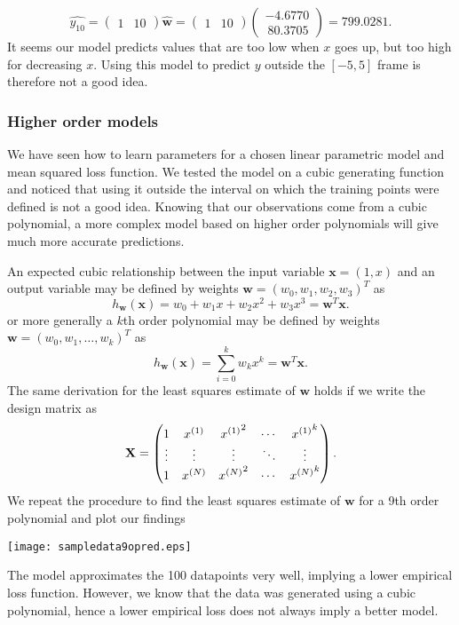 \documentclass[english]{article}
\begin{document}
\begin{equation}
\hat{y_{10}} = \begin{pmatrix}
1 & 10
\end{pmatrix} \hat{\textbf{w}} = \begin{pmatrix}
1 & 10
\end{pmatrix} \begin{pmatrix}
-4.6770 \\
\ 80.3705
\end{pmatrix} = 799.0281.
\end{equation}
It seems our model predicts values that are too low when $x$ goes up, but too high for decreasing $x$. Using this model to predict $y$ outside the $[-5,5]$ frame is therefore not a good idea.
\subsubsection{Higher order models}
We have seen how to learn parameters for a chosen linear parametric model and mean squared loss function. We tested the model on a cubic generating function and noticed that using it outside the interval on which the training points were defined is not a good idea. Knowing that our observations come from a cubic polynomial, a more complex model based on higher order polynomials will give much more accurate predictions.

An expected cubic relationship between the input variable $\textbf{x}=(1,x)$ and an output variable may be defined by weights $\textbf{w}=(w_0,w_1,w_2,w_3)^T$ as 
\begin{equation}\label{cubicrel}
h_\textbf{w}(\textbf{x})=w_0+w_1x + w_2x^2+w_3x^3 = \textbf{w}^T\textbf{x}.
\end{equation}
or more generally a $k$th order polynomial may be defined by weights $\textbf{w}=(w_0,w_1,\ldots,w_k)^T$ as 
\begin{equation}\label{kpolrel}
h_\textbf{w}(\textbf{x})= \sum_{i=0}^k w_k x^k = \textbf{w}^T\textbf{x}.
\end{equation}
The same derivation for the least squares estimate of $\textbf{w}$ holds if we write the design matrix as
\begin{align*}
\textbf{\textbf{X}} = \begin{pmatrix}
1 & {x^{(1)}}  & {x^{(1)}}^2 & \cdots & {x^{(1)}}^k  \\ \vdots & \vdots & \vdots & \ddots & \vdots \\ 
1 & {x}^{(N)} & {x^{(N)}}^2 & \cdots & {x^{(N)}}^k
\end{pmatrix}.
\end{align*}
We repeat the procedure to find the least squares estimate of $\textbf{w}$ for a 9th order polynomial and plot our findings
\begin{center}
	\texttt{[image: sampledata9opred.eps]}
\end{center}
The model approximates the 100 datapoints very well, implying a lower empirical loss function. However, we know that the data was generated using a cubic polynomial, hence a lower empirical loss does not always imply a better model.
\end{document}
